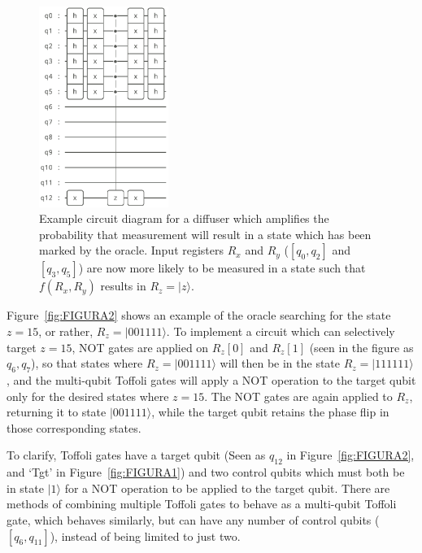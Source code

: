 \documentclass[twocolumn]{cinc}
\begin{document}
  \begin{figure}[!h]
  \centering
  \includegraphics[width=4.2cm]{diffuse.png}
  \caption{Example circuit diagram for a diffuser which amplifies the probability that
  measurement will result in a state which has been marked by the oracle.
  Input registers $R_x$ and $R_y$ ($[q_0,q_2]$ and $[q_3,q_5]$) are now 
  more likely to be measured in a state such that $f(R_x,R_y)$ results in $R_z=|z\rangle$.}\label{fig:FIGURA3}
  \end{figure}

  Figure~\ref{fig:FIGURA2} shows an example of the oracle searching for the state $z=15$,
  or rather, $R_z=|001111\rangle$. To implement a circuit which can selectively target
  $z=15$, NOT gates are applied on $R_z[0]$ and $R_z[1]$ (seen in the figure as $q_6,q_7$), 
  so that states where $R_z=|001111\rangle$ will then be in the
  state $R_z=|111111\rangle$, and the multi-qubit Toffoli gates\cite{multi_toffoli}
  will apply a NOT operation to the target qubit only for the desired states where $z=15$. 
  The NOT gates are again applied to $R_z$, returning it to state $|001111\rangle$,
  while the target qubit retains the phase flip in those corresponding states.

  To clarify, Toffoli gates have a target qubit (Seen as $q_{12}$ in Figure~\ref{fig:FIGURA2}, and `Tgt' in Figure~\ref{fig:FIGURA1}) 
  and two control qubits which must both be in state $|1\rangle$ for a NOT operation to be applied
  to the target qubit. There are methods of combining multiple Toffoli gates to behave
  as a multi-qubit Toffoli gate, which behaves similarly, but can have any number of control qubits ($[q_6,q_{11}]$),
  instead of being limited to just two\cite{multi_toffoli}.
\end{document}
